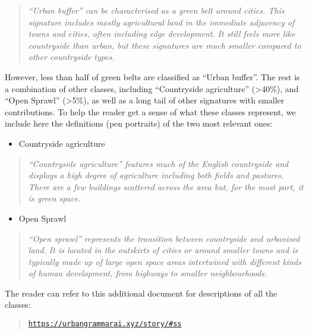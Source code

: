 \documentclass[
  letterpaper,
  DIV=11,
  numbers=noendperiod,
  oneside]{scrartcl}
\providecommand{\tightlist}{%
  \setlength{\itemsep}{0pt}\setlength{\parskip}{0pt}}\usepackage{longtable,booktabs,array}
\begin{document}
\begin{quote}
\emph{``Urban buffer'' can be characterised as a green belt around
cities. This signature includes mostly agricultural land in the
immediate adjacency of towns and cities, often including edge
development. It still feels more like countryside than urban, but these
signatures are much smaller compared to other countryside types.}
\end{quote}

However, less than half of green belts are classified as ``Urban
buffer''. The rest is a combination of other classes, including
``Countryside agriculture'' (\textgreater40\%), and ``Open Sprawl''
(\textgreater5\%), as well as a long tail of other signatures with
smaller contributions. To help the reader get a sense of what these
classes represent, we include here the definitions (pen portraits) of
the two most relevant ones:

\begin{itemize}
\tightlist
\item
  Countryside agriculture
\end{itemize}

\begin{quote}
\emph{``Countryside agriculture'' features much of the English
countryside and displays a high degree of agriculture including both
fields and pastures. There are a few buildings scattered across the area
but, for the most part, it is green space.}
\end{quote}

\begin{itemize}
\tightlist
\item
  Open Sprawl
\end{itemize}

\begin{quote}
\emph{``Open sprawl'' represents the transition between countryside and
urbanised land. It is located in the outskirts of cities or around
smaller towns and is typically made up of large open space areas
intertwined with different kinds of human development, from highways to
smaller neighbourhoods.}
\end{quote}

The reader can refer to this additional document for descriptions of all
the classes:

\begin{quote}
\href{https://urbangrammarai.xyz/story/\#ss}{\texttt{https://urbangrammarai.xyz/story/\#ss}}
\end{quote}
\end{document}

